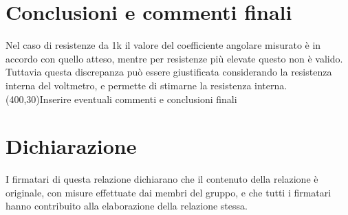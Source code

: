 \documentclass[10pt,a4paper]{article}
\begin{document}
\section{Conclusioni e commenti finali}
Nel caso di resistenze da 1k il valore del coefficiente angolare misurato è in accordo con quello atteso, mentre per resistenze più elevate questo non è valido. Tuttavia questa discrepanza può essere giustificata considerando la resistenza interna del voltmetro, e permette di stimarne la resistenza interna. 
\framebox(400,30){Inserire eventuali commenti e conclusioni finali}

\section*{Dichiarazione}
I firmatari di questa relazione dichiarano che il contenuto della relazione \`e originale, con misure effettuate dai membri del gruppo, e che tutti i firmatari hanno contribuito alla elaborazione della relazione stessa.
\end{document}

